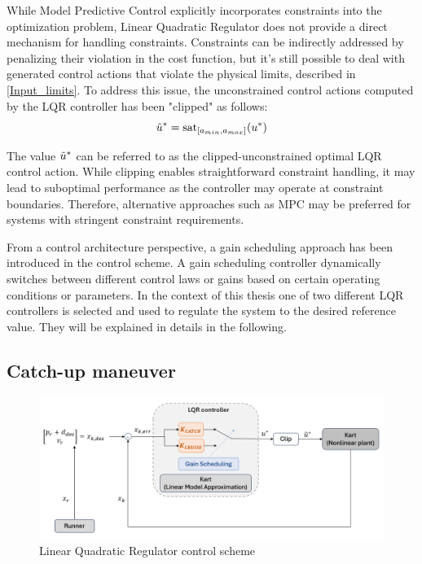 \documentclass[a4paper,12pt,oneside]{book}
\begin{document}
\bigskip
While Model Predictive Control explicitly incorporates constraints into the optimization problem, Linear Quadratic Regulator does not provide a direct mechanism for handling constraints.
Constraints can be indirectly addressed by penalizing their violation in the cost function, but it's still possible to deal with generated control actions that violate the physical limits, described in \eqref{Input_limits}.
To address this issue, the unconstrained control actions computed by the LQR controller has been "clipped" as follows:
\begin{equation}
    \Tilde{u}^* = \text{sat}_{[a_{min}, a_{max}]} (u^*)
\end{equation}

The value $\Tilde{u}^*$ can be referred to as the clipped-unconstrained optimal LQR control action.
While clipping enables straightforward constraint handling, it may lead to suboptimal performance as the controller may operate at constraint boundaries. 
Therefore, alternative approaches such as MPC may be preferred for systems with stringent constraint requirements.

\bigskip
From a control architecture perspective, a gain scheduling approach has been introduced in the control scheme.
A gain scheduling controller dynamically switches between different control laws or gains based on certain operating conditions or parameters.
In the context of this thesis one of two different LQR controllers is selected and used to regulate the system to the desired reference value.
They will be explained in details in the following.

\subsection{Catch-up maneuver}
\begin{figure}
	\centering
	\includegraphics[width=1.0\textwidth]{LQR_sim_scheme.png}
	\caption{Linear Quadratic Regulator control scheme}
	\label{image:LQR_sim_scheme}
\end{figure}
\end{document}
